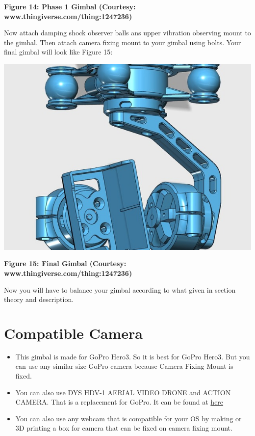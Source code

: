\documentclass[11pt,a4paper]{article}
\begin{document}
		\begin{center}
			\textbf{Figure 14: Phase 1 Gimbal (Courtesy:  www.thingiverse.com/thing:1247236)}
		\end{center}
		Now attach damping shock observer balls ans upper vibration observing mount to the gimbal. Then attach camera fixing mount to your gimbal using bolts. Your final gimbal will look like Figure 15:
		\begin{center}
			\includegraphics[scale=0.5]{Final_Gimbal.jpg}
		\end{center}
		\begin{center}
			\textbf{Figure 15: Final Gimbal (Courtesy:  www.thingiverse.com/thing:1247236)}
		\end{center}
		Now you will have to balance your gimbal according to what given in section theory and description.
	\section{Compatible Camera}
		\begin{itemize}
			\item This gimbal is made for GoPro Hero3. So it is best for GoPro Hero3. But you can use any similar size GoPro camera because Camera Fixing Mount is fixed.
			\item You can also use DYS HDV-1 AERIAL VIDEO DRONE and ACTION CAMERA. That is a replacement for GoPro. It can be found at \href{http://robokits.co.in/quadrotors-hexarotors-drones/fpv-video-telemetry-osd/dys-hdv-1-aerial-video-drone-action-camera-gopro-replacement?gclid=CjwKEAjw4dm6BRCQhtzl6Z6N4i0SJADFPu1nRx_Fo9jfIlLykMuizjcP-umoKJ5WaOs01bwGvmfgNhoC66Hw_wcB\&zenid=do0c7r2d5u3edfg460dpff1qi4}{here}
			\item You can also use any webcam that is compatible for your OS by making or 3D printing a box for camera that can be fixed on camera fixing mount.
		\end{itemize}
\end{document}
